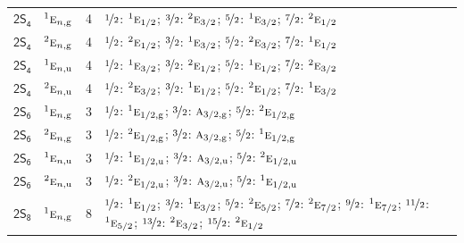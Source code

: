 \documentclass[10pt,a4paper]{article}
\numberwithin{equation}{section}
\newcommand{\grp}[1]{\mathsf{#1}}
\newcommand{\irr}[1]{\text{\normalfont\scshape #1}}
\newcommand{\conjpair}[1]{{}^{#1}}
\newcommand{\ptag}[1]{\mathrm{#1}}
\newlength{\fillwidth}\newlength{\cellwidth}\newlength{\colwidth}
\begin{document}
{\begin{longtable}{@{}llr>{\RaggedRight\arraybackslash}p{\fillwidth}@{}}
\href{2S4.pdf}{$\grp{2S_{4}}$} & $\conjpair{1}\irr{e}_{n,\ptag{g}}$ & 4 & $\nicefrac{1}{2}$: $\conjpair{1}\irr{e}_{1/2}$; $\nicefrac{3}{2}$: $\conjpair{2}\irr{e}_{3/2}$; $\nicefrac{5}{2}$: $\conjpair{1}\irr{e}_{3/2}$; $\nicefrac{7}{2}$: $\conjpair{2}\irr{e}_{1/2}$\\
\href{2S4.pdf}{$\grp{2S_{4}}$} & $\conjpair{2}\irr{e}_{n,\ptag{g}}$ & 4 & $\nicefrac{1}{2}$: $\conjpair{2}\irr{e}_{1/2}$; $\nicefrac{3}{2}$: $\conjpair{1}\irr{e}_{3/2}$; $\nicefrac{5}{2}$: $\conjpair{2}\irr{e}_{3/2}$; $\nicefrac{7}{2}$: $\conjpair{1}\irr{e}_{1/2}$\\
\href{2S4.pdf}{$\grp{2S_{4}}$} & $\conjpair{1}\irr{e}_{n,\ptag{u}}$ & 4 & $\nicefrac{1}{2}$: $\conjpair{1}\irr{e}_{3/2}$; $\nicefrac{3}{2}$: $\conjpair{2}\irr{e}_{1/2}$; $\nicefrac{5}{2}$: $\conjpair{1}\irr{e}_{1/2}$; $\nicefrac{7}{2}$: $\conjpair{2}\irr{e}_{3/2}$\\
\href{2S4.pdf}{$\grp{2S_{4}}$} & $\conjpair{2}\irr{e}_{n,\ptag{u}}$ & 4 & $\nicefrac{1}{2}$: $\conjpair{2}\irr{e}_{3/2}$; $\nicefrac{3}{2}$: $\conjpair{1}\irr{e}_{1/2}$; $\nicefrac{5}{2}$: $\conjpair{2}\irr{e}_{1/2}$; $\nicefrac{7}{2}$: $\conjpair{1}\irr{e}_{3/2}$\\
\href{2S6.pdf}{$\grp{2S_{6}}$} & $\conjpair{1}\irr{e}_{n,\ptag{g}}$ & 3 & $\nicefrac{1}{2}$: $\conjpair{1}\irr{e}_{1/2,\ptag{g}}$; $\nicefrac{3}{2}$: $\irr{a}_{3/2,\ptag{g}}$; $\nicefrac{5}{2}$: $\conjpair{2}\irr{e}_{1/2,\ptag{g}}$\\
\href{2S6.pdf}{$\grp{2S_{6}}$} & $\conjpair{2}\irr{e}_{n,\ptag{g}}$ & 3 & $\nicefrac{1}{2}$: $\conjpair{2}\irr{e}_{1/2,\ptag{g}}$; $\nicefrac{3}{2}$: $\irr{a}_{3/2,\ptag{g}}$; $\nicefrac{5}{2}$: $\conjpair{1}\irr{e}_{1/2,\ptag{g}}$\\
\href{2S6.pdf}{$\grp{2S_{6}}$} & $\conjpair{1}\irr{e}_{n,\ptag{u}}$ & 3 & $\nicefrac{1}{2}$: $\conjpair{1}\irr{e}_{1/2,\ptag{u}}$; $\nicefrac{3}{2}$: $\irr{a}_{3/2,\ptag{u}}$; $\nicefrac{5}{2}$: $\conjpair{2}\irr{e}_{1/2,\ptag{u}}$\\
\href{2S6.pdf}{$\grp{2S_{6}}$} & $\conjpair{2}\irr{e}_{n,\ptag{u}}$ & 3 & $\nicefrac{1}{2}$: $\conjpair{2}\irr{e}_{1/2,\ptag{u}}$; $\nicefrac{3}{2}$: $\irr{a}_{3/2,\ptag{u}}$; $\nicefrac{5}{2}$: $\conjpair{1}\irr{e}_{1/2,\ptag{u}}$\\
\href{2S8.pdf}{$\grp{2S_{8}}$} & $\conjpair{1}\irr{e}_{n,\ptag{g}}$ & 8 & $\nicefrac{1}{2}$: $\conjpair{1}\irr{e}_{1/2}$; $\nicefrac{3}{2}$: $\conjpair{1}\irr{e}_{3/2}$; $\nicefrac{5}{2}$: $\conjpair{2}\irr{e}_{5/2}$; $\nicefrac{7}{2}$: $\conjpair{2}\irr{e}_{7/2}$; $\nicefrac{9}{2}$: $\conjpair{1}\irr{e}_{7/2}$; $\nicefrac{11}{2}$: $\conjpair{1}\irr{e}_{5/2}$; $\nicefrac{13}{2}$: $\conjpair{2}\irr{e}_{3/2}$; $\nicefrac{15}{2}$: $\conjpair{2}\irr{e}_{1/2}$\\

\end{longtable}}
\end{document}
